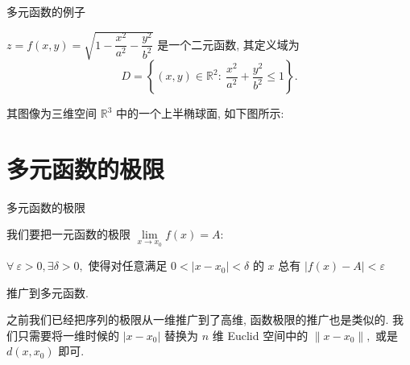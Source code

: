 
\begin{frame}{多元函数的例子}

$z = f(x, y) = \sqrt{1 - \dfrac{x^2}{a^2} - \dfrac{y^2}{b^2}}$ 是一个二元函数, 其定义域为
\pause
\[D = \left\{ (x,y) \in \mathbb{R}^2 : ~ \dfrac{x^2}{a^2} + \dfrac{y^2}{b^2} \leqslant 1 \right\}.\]

\pause

其图像为三维空间 $\mathbb{R}^3$ 中的一个上半椭球面, 如下图所示:

\begin{center}

\end{center}

\end{frame}


\section[多元函数的极限]{多元函数的极限}


\begin{frame}{多元函数的极限}

我们要把一元函数的极限 $\lim\limits_{x \to x_0} f(x) = A:$

\begin{center}
$\forall~\varepsilon > 0, \exists \delta > 0,$ 使得对任意满足 $0 < \lvert x - x_0 \rvert < \delta$ 的 $x$ 总有 $\lvert f(x) - A \rvert < \varepsilon$
\end{center}

推广到多元函数.

\pause
\vspace{1em}

之前我们已经把序列的极限从一维推广到了高维, 函数极限的推广也是类似的. 我们只需要将一维时候的 $\lvert x - x_0 \rvert$ 替换为 $n$ 维 Euclid 空间中的 $\lVert x - x_0 \rVert,$ 或是 $d(x, x_0)$ 即可.

\end{frame}


